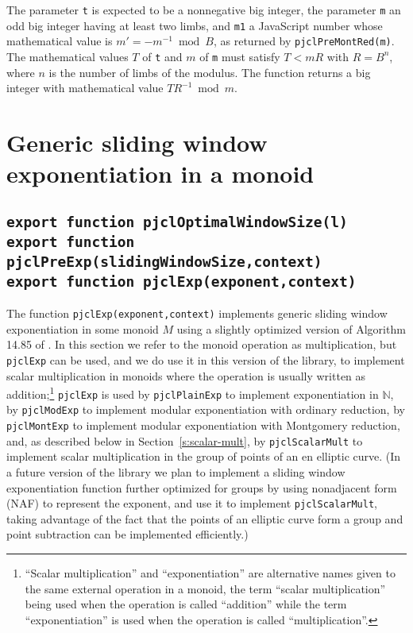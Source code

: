 \documentclass[12pt]{article}
\begin{document}
The parameter {\tt t} is expected to be a nonnegative big integer, 
the parameter {\tt m} an odd big integer having at least two limbs,
and {\tt m1} a JavaScript number whose mathematical value is $m' = -m^{-1} \bmod B$,
as returned by {\tt pjclPreMontRed(m)}.
The mathematical values $T$ of {\tt t} and $m$ of {\tt m} must satisfy
$T < mR$ with $R = B^n$, where $n$ is the number of limbs of the
modulus.  The function returns a big integer with mathematical value
$TR^{-1} \bmod m$.

\section{Generic sliding window exponentiation in a monoid}

\subsection{\tt export function pjclOptimalWindowSize(l)\\export function pjclPreExp(slidingWindowSize,context)\\export function pjclExp(exponent,context)}
\label{s:exp}

The function {\tt pjclExp(exponent,context)} implements generic
sliding window exponentiation in some monoid $M$ using a slightly
optimized version of Algorithm 14.85 of \cite{Menezes97handbookof}.
In this section we refer to the monoid operation as multiplication,
but {\tt pjclExp} can be used, and we do use it in this version of the
library, to implement scalar multiplication in monoids where the
operation is usually written as addition;\footnote{``Scalar multiplication'' and ``exponentiation'' are alternative names given
to the same external operation in a monoid, the term ``scalar multiplication''
being used when the operation is called ``addition'' while the term
``exponentiation'' is used when the operation is called
``multiplication''.}
 {\tt pjclExp} is used by
{\tt pjclPlainExp} to implement exponentiation in $\mathbb{N}$, by
{\tt pjclModExp} to implement modular exponentiation with ordinary
reduction, by {\tt pjclMontExp} to implement modular exponentiation
with Montgomery reduction, and, as described below in
Section~\ref{s:scalar-mult}, by {\tt pjclScalarMult} to implement
scalar multiplication in the group of points of an en elliptic curve.
(In a future version of the library we plan to implement a sliding
window exponentiation function further optimized for groups by using nonadjacent form (NAF) to represent the exponent, and use
it to implement {\tt pjclScalarMult}, taking advantage of the fact that
the points of an elliptic curve form a group and point subtraction can
be implemented efficiently.)
\end{document}
